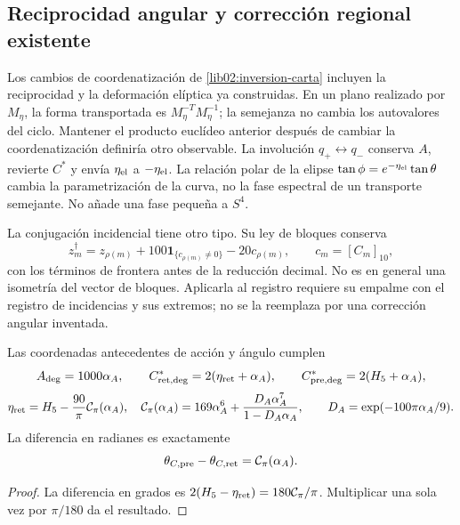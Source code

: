 \subsection{Reciprocidad angular y corrección regional existente}
\label{lib02:correccion-regional}

Los cambios de coordenatización de \cref{lib02:inversion-carta} incluyen la
reciprocidad y la deformación elíptica ya construidas. En un plano
realizado por \(M_\eta\), la forma transportada es
\(M_\eta^{-T}M_\eta^{-1}\); la semejanza no cambia los
autovalores del ciclo. Mantener el producto euclídeo anterior después de
cambiar la coordenatización definiría otro observable. La involución
\(q_+\leftrightarrow q_-\) conserva \(A\), revierte \(C^*\)
y envía \(\eta_{\rm el}\) a \(-\eta_{\rm el}\). La relación
polar de la elipse
\(\tan\phi=e^{-\eta_{\rm el}}\tan\theta\) cambia la
parametrización de la curva, no la fase espectral de un transporte
semejante. No añade una fase pequeña a \(S^4\).

La conjugación incidencial tiene otro tipo. Su ley de bloques conserva
\[
 z_m^\dagger=z_{\rho(m)}
 +100\mathbf1_{\{c_{\rho(m)}\ne0\}}-20c_{\rho(m)},
 \qquad c_m=[C_m]_{10},
\]
con los términos de frontera antes de la reducción decimal. No es en
general una isometría del vector de bloques. Aplicarla al registro
requiere su empalme con el registro de incidencias y sus extremos; no se la
reemplaza por una corrección angular inventada.

\begin{proposition}
\label{lib02:retorno-regional}
Las coordenadas antecedentes de acción y ángulo cumplen
\[
 A_{\rm deg}=1000\alpha_A,\qquad
 C^*_{\rm ret,deg}=2(\eta_{\rm ret}+\alpha_A),\qquad
 C^*_{\rm pre,deg}=2(H_5+\alpha_A),
\]
\[
 \eta_{\rm ret}=H_5-\frac{90}{\pi}\mathcal C_\pi(\alpha_A),
 \quad
 \mathcal C_\pi(\alpha_A)=169\alpha_A^6+
 \frac{D_A\alpha_A^7}{1-D_A\alpha_A},\qquad
 D_A=\exp(-100\pi\alpha_A/9).
\]
La diferencia en radianes es exactamente
\[
 \theta_{C,\rm pre}-\theta_{C,\rm ret}=\mathcal C_\pi(\alpha_A).
\]
\end{proposition}
\begin{proof}
La diferencia en grados es
\(2(H_5-\eta_{\rm ret})=180\mathcal C_\pi/\pi\).
Multiplicar una sola vez por \(\pi/180\) da el resultado.
\end{proof}

